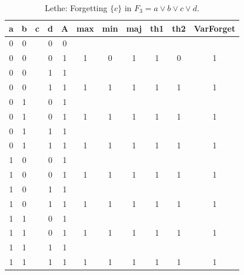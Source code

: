 \begin{table}[!tb]
    \centering
    \begin{tabular}{|c|c|c|c|c|c|c|c|c|c|c|}
        \hline
        \textbf{a} & \textbf{b} & \textbf{c} & \textbf{d} & \textbf{A} & \textbf{max} & \textbf{min} & \textbf{maj} & \textbf{th1} & \textbf{th2} & \textbf{VarForget} \\ \hline
        \rowcolor{gray!40} 0 & 0 &  & 0 & 0 &  &  &  &  &  &  \\ \hline
        \rowcolor{gray!40} 0 & 0 &  & 0 & 1 & 1 & 0 & 1 & 1 & 0 & 1 \\ \hline
        \rowcolor{blue!40} 0 & 0 &  & 1 & 1 &  &  &  &  &  &  \\ \hline
        \rowcolor{blue!40} 0 & 0 &  & 1 & 1 & 1 & 1 & 1 & 1 & 1 & 1 \\ \hline
        \rowcolor{red!40} 0 & 1 &  & 0 & 1 &  &  &  &  &  &  \\ \hline
        \rowcolor{red!40} 0 & 1 &  & 0 & 1 & 1 & 1 & 1 & 1 & 1 & 1 \\ \hline
        \rowcolor{green!40} 0 & 1 &  & 1 & 1 &  &  &  &  &  &  \\ \hline
        \rowcolor{green!40} 0 & 1 &  & 1 & 1 & 1 & 1 & 1 & 1 & 1 & 1 \\ \hline
        \rowcolor{yellow!40} 1 & 0 &  & 0 & 1 &  &  &  &  &  &  \\ \hline
        \rowcolor{yellow!40} 1 & 0 &  & 0 & 1 & 1 & 1 & 1 & 1 & 1 & 1 \\ \hline
        \rowcolor{gray!40} 1 & 0 &  & 1 & 1 &  &  &  &  &  &  \\ \hline
        \rowcolor{gray!40} 1 & 0 &  & 1 & 1 & 1 & 1 & 1 & 1 & 1 & 1 \\ \hline
        \rowcolor{blue!40} 1 & 1 &  & 0 & 1 &  &  &  &  &  &  \\ \hline
        \rowcolor{blue!40} 1 & 1 &  & 0 & 1 & 1 & 1 & 1 & 1 & 1 & 1 \\ \hline
        \rowcolor{red!40} 1 & 1 &  & 1 & 1 &  &  &  &  &  &  \\ \hline
        \rowcolor{red!40} 1 & 1 &  & 1 & 1 & 1 & 1 & 1 & 1 & 1 & 1 \\ \hline
    \end{tabular}
    \caption{Lethe: Forgetting $\{c\}$ in $F_{3} = a \lor b \lor c \lor d$.}
    \label{tab:lethe-F3-c}
\end{table}
